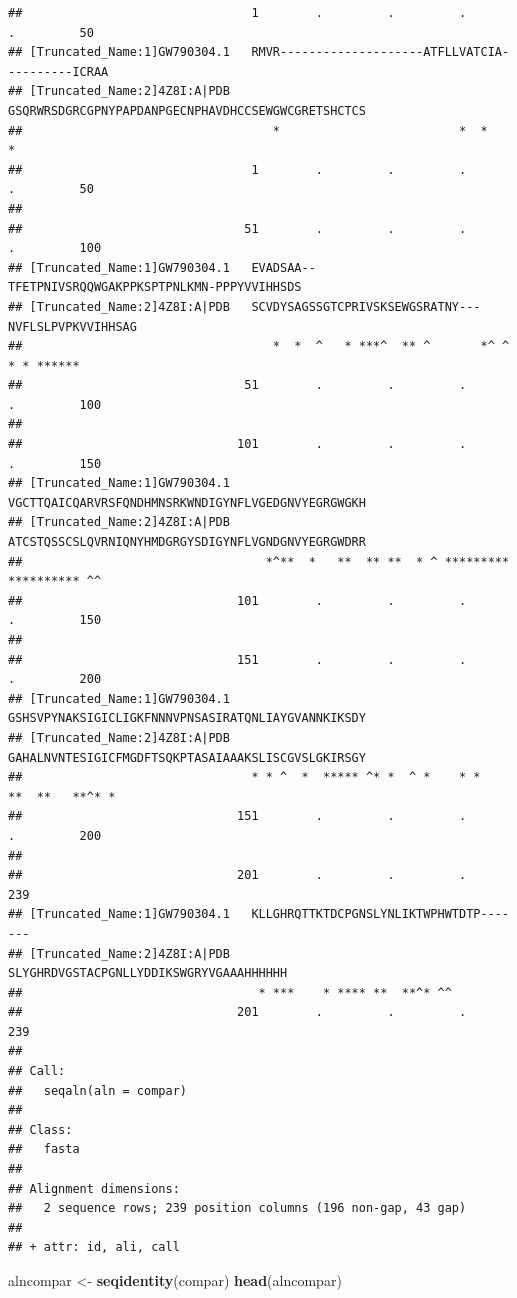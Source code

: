 \documentclass[]{article}
\newenvironment{Shaded}{\begin{snugshade}}{\end{snugshade}}
\newcommand{\KeywordTok}[1]{\textcolor[rgb]{0.13,0.29,0.53}{\textbf{#1}}}
\newcommand{\StringTok}[1]{\textcolor[rgb]{0.31,0.60,0.02}{#1}}
\newcommand{\NormalTok}[1]{#1}
\begin{document}
\begin{verbatim}
##                                1        .         .         .         .         50 
## [Truncated_Name:1]GW790304.1   RMVR--------------------ATFLLVATCIA----------ICRAA
## [Truncated_Name:2]4Z8I:A|PDB   GSQRWRSDGRCGPNYPAPDANPGECNPHAVDHCCSEWGWCGRETSHCTCS
##                                   *                         *  *             *    
##                                1        .         .         .         .         50 
## 
##                               51        .         .         .         .         100 
## [Truncated_Name:1]GW790304.1   EVADSAA--TFETPNIVSRQQWGAKPPKSPTPNLKMN-PPPYVVIHHSDS
## [Truncated_Name:2]4Z8I:A|PDB   SCVDYSAGSSGTCPRIVSKSEWGSRATNY---NVFLSLPVPKVVIHHSAG
##                                   *  *  ^   * ***^  ** ^       *^ ^  * * ******   
##                               51        .         .         .         .         100 
## 
##                              101        .         .         .         .         150 
## [Truncated_Name:1]GW790304.1   VGCTTQAICQARVRSFQNDHMNSRKWNDIGYNFLVGEDGNVYEGRGWGKH
## [Truncated_Name:2]4Z8I:A|PDB   ATCSTQSSCSLQVRNIQNYHMDGRGYSDIGYNFLVGNDGNVYEGRGWDRR
##                                  *^**  *   **  ** **  * ^ ********* ********** ^^ 
##                              101        .         .         .         .         150 
## 
##                              151        .         .         .         .         200 
## [Truncated_Name:1]GW790304.1   GSHSVPYNAKSIGICLIGKFNNNVPNSASIRATQNLIAYGVANNKIKSDY
## [Truncated_Name:2]4Z8I:A|PDB   GAHALNVNTESIGICFMGDFTSQKPTASAIAAAKSLISCGVSLGKIRSGY
##                                * * ^  *  ***** ^* *  ^ *    * *   **  **   **^* * 
##                              151        .         .         .         .         200 
## 
##                              201        .         .         .        239 
## [Truncated_Name:1]GW790304.1   KLLGHRQTTKTDCPGNSLYNLIKTWPHWTDTP-------
## [Truncated_Name:2]4Z8I:A|PDB   SLYGHRDVGSTACPGNLLYDDIKSWGRYVGAAAHHHHHH
##                                 * ***    * **** **  **^* ^^            
##                              201        .         .         .        239 
## 
## Call:
##   seqaln(aln = compar)
## 
## Class:
##   fasta
## 
## Alignment dimensions:
##   2 sequence rows; 239 position columns (196 non-gap, 43 gap) 
## 
## + attr: id, ali, call
\end{verbatim}

\begin{Shaded}
\begin{Highlighting}[]
\NormalTok{alncompar <-}\StringTok{ }\KeywordTok{seqidentity}\NormalTok{(compar)}
\KeywordTok{head}\NormalTok{(alncompar)}
\end{Highlighting}
\end{Shaded}
\end{document}
